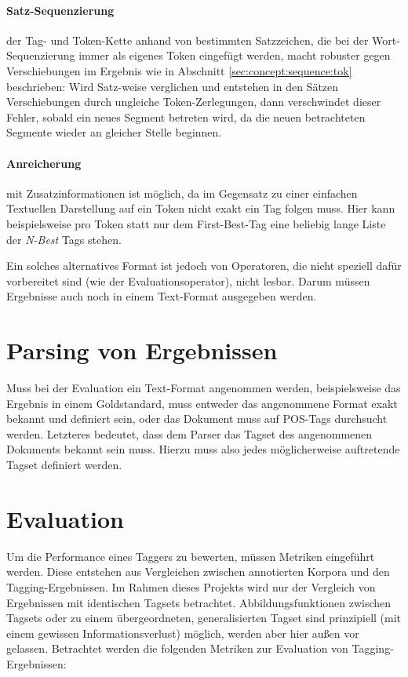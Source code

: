 \paragraph{Satz-Sequenzierung} der Tag- und Token-Kette anhand von bestimmten Satzzeichen, die bei der Wort-Sequenzierung immer als eigenes Token eingefügt werden, macht robuster gegen Verschiebungen im Ergebnis wie in Abschnitt \ref{sec:concept:sequence:tok} beschrieben: Wird Satz-weise verglichen und entstehen in den Sätzen Verschiebungen durch ungleiche Token-Zerlegungen, dann verschwindet dieser Fehler, sobald ein neues Segment betreten wird, da die neuen betrachteten Segmente wieder an gleicher Stelle beginnen.
\paragraph{Anreicherung} mit Zusatzinformationen ist möglich, da im Gegensatz zu einer einfachen Textuellen Darstellung auf ein Token nicht exakt ein Tag folgen muss. Hier kann beispielsweise pro Token statt nur dem First-Best-Tag eine beliebig lange Liste der \textit{N-Best} Tags stehen.

Ein solches alternatives Format ist jedoch von Operatoren, die nicht speziell dafür vorbereitet sind (wie der Evaluationsoperator), nicht lesbar. Darum müssen Ergebnisse auch noch in einem Text-Format ausgegeben werden.

\section{Parsing von Ergebnissen}
Muss bei der Evaluation ein Text-Format angenommen werden, beispielsweise das Ergebnis in einem Goldstandard, muss entweder das angenommene Format exakt bekannt und definiert sein, oder das Dokument muss auf POS-Tags durchsucht werden. Letzteres bedeutet, dass dem Parser das Tagset des angenommenen Dokuments bekannt sein muss. Hierzu muss also jedes möglicherweise auftretende Tagset definiert werden.

\section{Evaluation}
\label{sec:concept:eval}
Um die Performance eines Taggers zu bewerten, müssen Metriken eingeführt werden. Diese entstehen aus Vergleichen zwischen annotierten Korpora und den Tagging-Ergebnissen. Im Rahmen dieses Projekts wird nur der Vergleich von Ergebnissen mit identischen Tagsets betrachtet. Abbildungsfunktionen zwischen Tagsets oder zu einem übergeordneten, generalisierten Tagset sind prinzipiell (mit einem gewissen Informationsverlust) möglich, werden aber hier außen vor gelassen. Betrachtet werden die folgenden Metriken zur Evaluation von Tagging-Ergebnissen:




